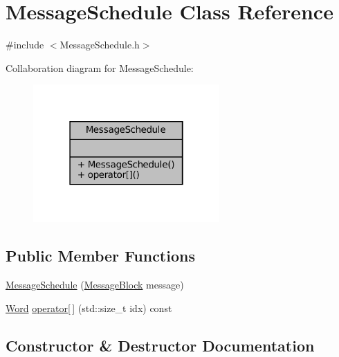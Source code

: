 \hypertarget{class_message_schedule}{}\section{Message\+Schedule Class Reference}
\label{class_message_schedule}


{\ttfamily \#include $<$Message\+Schedule.\+h$>$}



Collaboration diagram for Message\+Schedule\+:
\nopagebreak
\begin{figure}[H]
\begin{center}
\leavevmode
\includegraphics[width=202pt]{class_message_schedule__coll__graph}
\end{center}
\end{figure}
\subsection*{Public Member Functions}
\begin{DoxyCompactItemize}
\item 
\mbox{\hyperlink{class_message_schedule_a2ae783d0229259a87ef86c5e57f6aac3}{Message\+Schedule}} (\mbox{\hyperlink{class_message_block}{Message\+Block}} message)
\item 
\mbox{\hyperlink{class_word}{Word}} \mbox{\hyperlink{class_message_schedule_a06cb96598e3eccca151faa39ba414ff2}{operator\mbox{[}$\,$\mbox{]}}} (std\+::size\+\_\+t idx) const
\end{DoxyCompactItemize}


\subsection{Constructor \& Destructor Documentation}
\mbox{\label{class_message_schedule_a2ae783d0229259a87ef86c5e57f6aac3}} 
